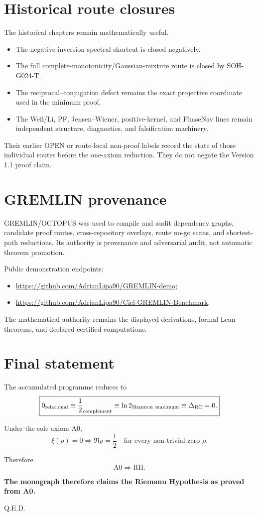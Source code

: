\section*{Historical route closures}

The historical chapters remain mathematically useful.

\begin{itemize}
  \item The negative-inversion spectral shortcut is closed negatively.
  \item The full complete-monotonicity/Gaussian-mixture route is closed by
  SOH-G024-T.
  \item The reciprocal--conjugation defect remains the exact projective
  coordinate used in the minimum proof.
  \item The Weil/Li, PF, Jensen--Wiener, positive-kernel, and PhaseNav lines
  remain independent structure, diagnostics, and falsification machinery.
\end{itemize}

Their earlier OPEN or route-local non-proof labels record the state of those individual routes before the one-axiom reduction. They do not negate the Version 1.1 proof claim.

\section*{GREMLIN provenance}

GREMLIN/OCTOPUS was used to compile and audit dependency graphs, candidate
proof routes, cross-repository overlays, route no-go scans, and shortest-path
reductions. Its authority is provenance and adversarial audit, not automatic
theorem promotion.

Public demonstration endpoints:
\begin{itemize}
  \item \url{https://github.com/AdrianLipa90/GREMLIN-demo};
  \item \url{https://github.com/AdrianLipa90/Ciel-GREMLIN-Benchmark}.
\end{itemize}

The mathematical authority remains the displayed derivations, formal Lean
theorems, and declared certified computations.

\section*{Final statement}

The accumulated programme reduces to
\[
\boxed{
0_{\rm relational}
\equiv
\frac12_{\rm complement}
\equiv
\ln2_{\rm Shannon\ maximum}
\equiv
\Delta_{\rm RC}=0.
}
\]

Under the sole axiom A0,
\[
\boxed{
\xi(\rho)=0
\Longrightarrow
\Re\rho=\frac12
\quad
\text{for every non-trivial zero }\rho.
}
\]

Therefore
\[
\boxed{\mathrm{A0}\Longrightarrow\mathrm{RH}.}
\]

\noindent\textbf{The monograph therefore claims the Riemann Hypothesis as proved from A0.}\par
\medskip
\hfill Q.E.D.
